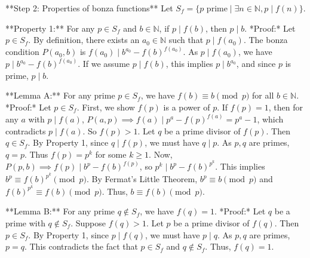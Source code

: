 \documentclass[12pt]{article}
\begin{document}
**Step 2: Properties of bonza functions**
Let $S_f = \{p \text{ prime} \mid \exists n \in \mathbb N, p \mid f(n)\}$.

**Property 1:** For any $p \in S_f$ and $b \in \mathbb{N}$, if $p \mid f(b)$, then $p \mid b$.
*Proof:* Let $p \in S_f$. By definition, there exists an $a_0 \in \mathbb{N}$ such that $p \mid f(a_0)$. The bonza condition $P(a_0, b)$ is $f(a_0) \mid b^{a_0} - f(b)^{f(a_0)}$. As $p \mid f(a_0)$, we have $p \mid b^{a_0} - f(b)^{f(a_0)}$. If we assume $p \mid f(b)$, this implies $p \mid b^{a_0}$, and since $p$ is prime, $p \mid b$.

**Lemma A:** For any prime $p \in S_f$, we have $f(b) \equiv b \pmod p$ for all $b \in \mathbb N$.
*Proof:* Let $p \in S_f$. First, we show $f(p)$ is a power of $p$. If $f(p)=1$, then for any $a$ with $p \mid f(a)$, $P(a,p) \implies f(a) \mid p^a-f(p)^{f(a)} = p^a-1$, which contradicts $p \mid f(a)$. So $f(p)>1$. Let $q$ be a prime divisor of $f(p)$. Then $q \in S_f$. By Property 1, since $q \mid f(p)$, we must have $q \mid p$. As $p,q$ are primes, $q=p$. Thus $f(p)=p^k$ for some $k \ge 1$.
Now, $P(p,b) \implies f(p) \mid b^p - f(b)^{f(p)}$, so $p^k \mid b^p - f(b)^{p^k}$. This implies $b^p \equiv f(b)^{p^k} \pmod p$. By Fermat's Little Theorem, $b^p \equiv b \pmod p$ and $f(b)^{p^k} \equiv f(b) \pmod p$. Thus, $b \equiv f(b) \pmod p$.

**Lemma B:** For any prime $q \notin S_f$, we have $f(q)=1$.
*Proof:* Let $q$ be a prime with $q \notin S_f$. Suppose $f(q)>1$. Let $p$ be a prime divisor of $f(q)$. Then $p \in S_f$. By Property 1, since $p \mid f(q)$, we must have $p \mid q$. As $p,q$ are primes, $p=q$. This contradicts the fact that $p \in S_f$ and $q \notin S_f$. Thus, $f(q)=1$.
\end{document}
